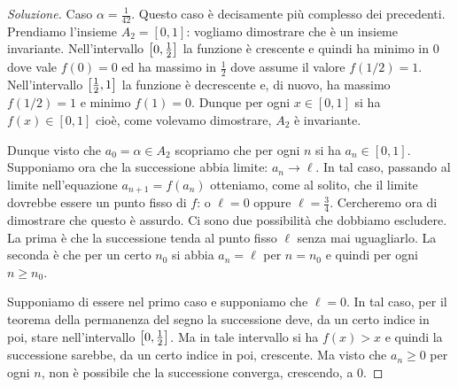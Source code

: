 \begin{proof}[Soluzione]
  Caso $\alpha = \frac 1{42}$. Questo caso è decisamente più complesso dei
  precedenti. Prendiamo l'insieme $A_2 = [0, 1]$: vogliamo dimostrare
  che è un insieme invariante. Nell'intervallo $\left[0,\frac 1 2\right]$ la funzione è
  crescente e quindi ha minimo in $0$ dove vale $f(0)=0$ ed ha
  massimo in $\frac 1 2$ dove assume il valore $f(1/2) = 1$. Nell'intervallo
  $\left[\frac 1 2,1\right]$ la funzione è decrescente e, di nuovo, ha massimo $f(1/2)=1$ e
  minimo $f(1)=0$. Dunque per ogni $x\in [0,1]$ si ha $f(x) \in
  [0,1]$ cioè, come volevamo dimostrare, $A_2$ è invariante.

  Dunque visto che $a_0 = \alpha \in A_2$ scopriamo che per ogni $n$
  si ha $a_n \in [0,1]$. Supponiamo ora che la successione abbia
  limite: $a_n \to \ell$. In tal caso, passando al limite
  nell'equazione $a_{n+1} = f(a_n)$ otteniamo, come al solito, che il
  limite dovrebbe essere un punto fisso di $f$: o $\ell=0$ oppure
  $\ell=\frac 3 4$. Cercheremo ora di dimostrare che questo è assurdo. Ci sono
  due possibilità che dobbiamo escludere. La prima è che la
  successione tenda al punto fisso $\ell$ senza mai uguagliarlo. La
  seconda è che per un certo $n_0$ si abbia $a_n = \ell$ per $n=n_0$ e
  quindi per ogni $n\ge n_0$.

  Supponiamo di essere nel primo caso e supponiamo che $\ell = 0$. In
  tal caso, per il teorema della permanenza del segno la successione
  deve, da un certo indice in poi, stare nell'intervallo $\left[0,\frac 1 2\right]$. Ma
  in tale intervallo si ha $f(x)>x$ e quindi la successione sarebbe,
  da un certo indice in poi, crescente. Ma visto che $a_n \ge 0$ per
  ogni $n$, non è possibile che la successione converga, crescendo, a
  $0$.


\end{proof}
